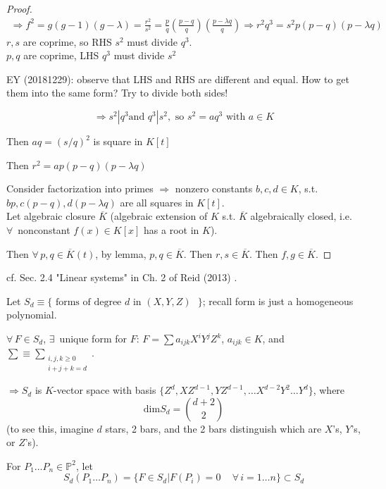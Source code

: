 \documentclass[10pt]{amsart}
\begin{document}
\begin{multicols*}{2}
\begin{proof}
\[
\begin{gathered}
\Longrightarrow f^2 = g(g-1)(g-\lambda) = \frac{r^2 }{s^2} = \frac{p}{q} \left( \frac{ p-q}{q} \right)\left( \frac{ p - \lambda q}{q} \right) \Longrightarrow r^2 q^3 = s^2 p(p-q)(p-\lambda q)
\end{gathered}
\]
$r,s$ are coprime, so RHS $s^2$ must divide $q^3$. \\
$p,q$ are coprime, LHS $q^3$ must divide $s^2$

EY (20181229): observe that LHS and RHS are different and equal. How to get them into the same form? Try to divide both sides!

\[
\Longrightarrow s^2 | q^3 \text{and } q^3 | s^2, \text{ so } s^2 = aq^3 \text{ with } a \in K
\]

Then $aq = (s/q)^2$ is square in $K[t]$

Then $r^2 = ap(p-q)(p-\lambda q)$

Consider factorization into primes $\Longrightarrow$ nonzero constants $b,c,d \in K$, s.t. $bp, c(p-q), d(p-\lambda q)$ are all squares in $K[t]$. \\
Let algebraic closure $\overline{K}$ (algebraic extension of $K$ s.t. $\overline{K}$ algebraically closed, i.e. $\forall \, $ nonconstant $f(x) \in K[x]$ has a root in $K$).

Then $\forall \, p, q \in \overline{K}(t)$, by lemma, $p,q \in \overline{K}$. Then $r,s \in \overline{K}$.  Then $\boxed{ f, g \in \overline{K}}$.

		\end{proof}
	

cf. Sec. 2.4 "Linear systems" in Ch. 2 of Reid (2013) \cite{Reid2013}.

Let $S_d \equiv \lbrace \text{ forms of degree $d$ in $(X, Y, Z)$ } \rbrace$; recall form is just a homogeneous polynomial.

$\forall \, F \in S_d$, $\exists \, $ unique form for $F$: $F = \sum a_{ijk} X^i Y^j Z^k$, $a_{ijk} \in K$, and $\sum \equiv \sum_{ \substack{ i,j,k \geq 0 \\ i + j + k = d } }$.

$\Longrightarrow S_d $ is $K$-vector space with basis $\lbrace Z^d, XZ^{d-1}, YZ^{d-1}, \dots X^{d-2} Y^2 \dots Y^d \rbrace$, where
\[
\boxed{ \text{dim}S_d  = \binom{d+2}{2} }
\]
(to see this, imagine $d$ stars, 2 bars, and the 2 bars distinguish which are $X$'s, $Y$'s, or $Z$'s). 

For $P_1 \dots P_n \in \mathbb{P}^2$, let 
\[
S_d(P_1 \dots P_n) = \lbrace F \in S_d | F(P_i) =0 \quad \, \forall \, i = 1 \dots n \rbrace \subset S_d
\]


\end{multicols*}
\end{document}
